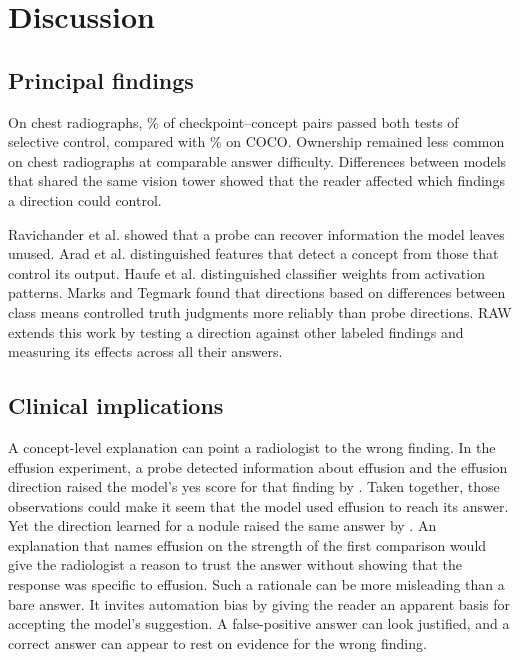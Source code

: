 \section{Discussion}
\label{sec:implications}

\subsection{Principal findings}

On chest radiographs, \jnTwoWayChestPct{}\% of checkpoint--concept pairs passed both tests of selective control, compared with \jnTwoWayCocoPct{}\% on COCO. Ownership remained less common on chest radiographs at comparable answer difficulty. Differences between models that shared the same vision tower showed that the reader affected which findings a direction could control.

Ravichander et al.\cite{ravichander2021probing} showed that a probe can recover information the model leaves unused. Arad et al.\cite{arad2025saes} distinguished features that detect a concept from those that control its output. Haufe et al.\cite{haufe2014interpretation} distinguished classifier weights from activation patterns. Marks and Tegmark\cite{marks2024geometry} found that directions based on differences between class means controlled truth judgments more reliably than probe directions. RAW extends this work by testing a direction against other labeled findings and measuring its effects across all their answers.

\subsection{Clinical implications}
\label{sec:clinical-implications}

A concept-level explanation can point a radiologist to the wrong finding. In the effusion experiment, a probe detected information about effusion and the effusion direction raised the model's yes score for that finding by \cfSeedWEff{}. Taken together, those observations could make it seem that the model used effusion to reach its answer. Yet the direction learned for a nodule raised the same answer by \cfSeedWNodule{}. An explanation that names effusion on the strength of the first comparison would give the radiologist a reason to trust the answer without showing that the response was specific to effusion. Such a rationale can be more misleading than a bare answer. It invites automation bias by giving the reader an apparent basis for accepting the model's suggestion. A false-positive answer can look justified, and a correct answer can appear to rest on evidence for the wrong finding.

